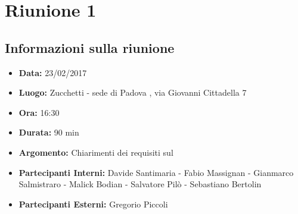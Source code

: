 	\section{Riunione 1}
	  \subsection{Informazioni sulla riunione}
	    \begin{itemize}
	      \item \textbf{Data: } 23/02/2017
	      \item \textbf{Luogo: } Zucchetti - sede di Padova , via Giovanni Cittadella 7
	      \item \textbf{Ora: } 16:30
	      \item \textbf{Durata: } 90 min
	      \item \textbf{Argomento: } Chiarimenti dei requisiti sul 
	      \item \textbf{Partecipanti Interni: } Davide Santimaria - Fabio Massignan - Gianmarco Salmistraro - Malick Bodian - Salvatore Pilò - Sebastiano Bertolin
	      \item \textbf{Partecipanti Esterni: } Gregorio Piccoli
	    \end{itemize}
